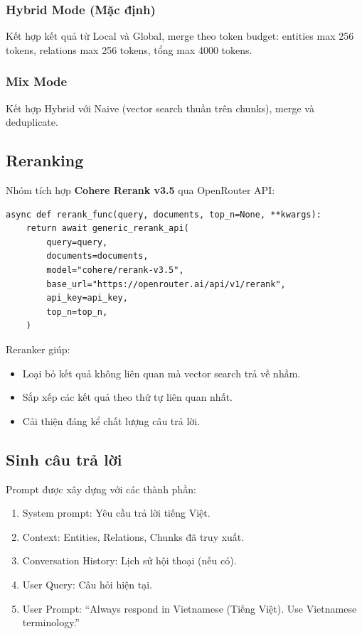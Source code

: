 \documentclass[12pt,a4paper]{article}
\begin{document}
\subsubsection{Hybrid Mode (Mặc định)}

Kết hợp kết quả từ Local và Global, merge theo token budget: entities max 256 tokens, relations max 256 tokens, tổng max 4000 tokens.

\subsubsection{Mix Mode}

Kết hợp Hybrid với Naive (vector search thuần trên chunks), merge và deduplicate.

\subsection{Reranking}

Nhóm tích hợp \textbf{Cohere Rerank v3.5} qua OpenRouter API:

\begin{lstlisting}[language=pseudo,caption={Cấu hình Reranker}]
async def rerank_func(query, documents, top_n=None, **kwargs):
    return await generic_rerank_api(
        query=query,
        documents=documents,
        model="cohere/rerank-v3.5",
        base_url="https://openrouter.ai/api/v1/rerank",
        api_key=api_key,
        top_n=top_n,
    )
\end{lstlisting}

Reranker giúp:
\begin{itemize}
  \item Loại bỏ kết quả không liên quan mà vector search trả về nhầm.
  \item Sắp xếp các kết quả theo thứ tự liên quan nhất.
  \item Cải thiện đáng kể chất lượng câu trả lời.
\end{itemize}

\subsection{Sinh câu trả lời}

Prompt được xây dựng với các thành phần:
\begin{enumerate}
  \item System prompt: Yêu cầu trả lời tiếng Việt.
  \item Context: Entities, Relations, Chunks đã truy xuất.
  \item Conversation History: Lịch sử hội thoại (nếu có).
  \item User Query: Câu hỏi hiện tại.
  \item User Prompt: ``Always respond in Vietnamese (Tiếng Việt). Use Vietnamese terminology.''
\end{enumerate}
\end{document}
